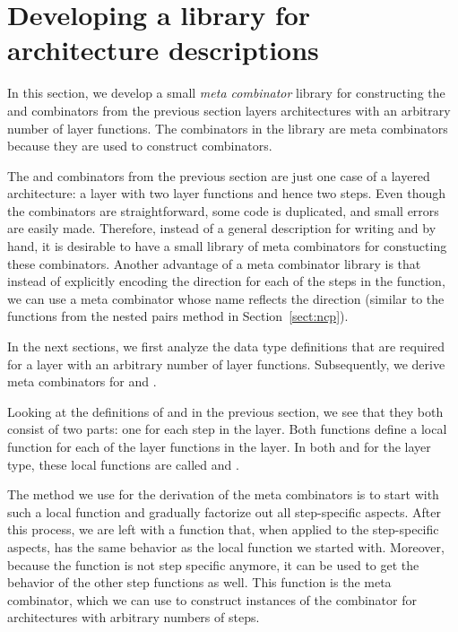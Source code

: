 \documentclass[preprint,natbib]{sigplanconf}
\begin{document}
%																
%																
%																
\section{Developing a library for architecture descriptions} \label{sect:lib}

In this section, we develop a small {\em meta combinator} library for constructing the  and  combinators from the previous section  layers architectures with an arbitrary number of layer functions. The combinators in the library are meta combinators because they are used to construct combinators.

The  and  combinators from the previous section are just one case of a layered architecture: a layer with two layer functions and hence two steps. Even though the combinators are straightforward, some code is duplicated, and small errors are easily made. Therefore, instead of a general description for writing  and  by hand, it is desirable to have a small library of meta combinators for constucting these combinators. Another advantage of a meta combinator library is that instead of explicitly encoding the direction for each of the steps in the  function, we can use a meta combinator whose name reflects the direction (similar to the  functions from the nested pairs method in Section~\ref{sect:ncp}).

In the next sections, we first analyze the data type definitions that are required for a layer with an arbitrary number of layer functions. Subsequently, we derive meta combinators for  and . 

Looking at the definitions of  and  in the previous section, we see that they both consist of two parts: one for each step in the layer. Both functions define a local function for each of the layer functions in the layer. In both  and  for the  layer type, these local functions are called  and . 

The method we use for the derivation of the meta combinators is to start with such a local function and gradually factorize out all step-specific aspects. After this process, we are left with a function that, when applied to the step-specific aspects, has the same behavior as the local function we started with. Moreover, because the function is not step specific anymore, it can be used to get the behavior of the other step functions as well. This function is the meta combinator, which we can use to construct instances of the combinator for architectures with arbitrary numbers of steps. 
\end{document}
